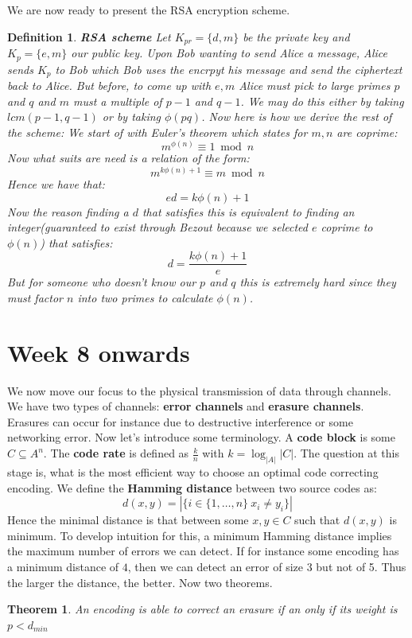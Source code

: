 \documentclass[titlepage]{article}
\newtheorem{theorem}{Theorem}[section]
\newtheorem{definition}{Definition}
\begin{document}
We are now ready to present the RSA encryption scheme.
\begin{definition}\textbf{RSA scheme}
Let $K_{pr} = \{d,m\}$ be the private key and $K_{p} = \{e,m\}$ our public key. Upon Bob wanting to send Alice a message, Alice sends $K_{p}$ to Bob which Bob uses the encrpyt his message and send the ciphertext back to Alice. But before, to come up with $e,m$ Alice must pick to large primes $p$ and $q$ and $m$ must a multiple of $p-1$ and $q-1$. We may do this either by taking $lcm(p-1,q-1)$ or by taking $\phi(pq)$. Now here is how we derive the rest of the scheme:
We start of with Euler's theorem which states for $m,n$ are coprime:
$$m^{\phi(n)} \equiv 1 \bmod{n}$$
Now what suits are need is a relation of the form:
$$m^{k\phi(n) + 1} \equiv m \bmod{n}$$
Hence we have that:
$$ed = k\phi(n)+1$$
Now the reason finding a $d$ that satisfies this is equivalent to finding an integer(guaranteed to exist through Bezout because we selected $e$ coprime to $\phi(n)$) that satisfies:
$$d = \frac{k\phi(n)+1}{e}$$
But for someone who doesn't know our $p$ and $q$ this is extremely hard since they must factor $n$ into two primes to calculate $\phi(n)$. 
\end{definition}


\section{Week 8 onwards}
We now move our focus to the physical transmission of data through channels. We have two types of channels: \textbf{error channels} and \textbf{erasure channels}. Erasures can occur for instance due to destructive interference or some networking error. Now let's introduce some terminology. A \textbf{code block} is some $C \subseteq A^{n}$. The \textbf{code rate} is defined as $\frac{k}{n}$ with $k = \log_{|A|}{|C|}$. The question at this stage is, what is the most efficient way to choose an optimal code correcting encoding. We define the \textbf{Hamming distance} between two source codes as:
$$d(x,y) = |\{i \in \{1,\ldots,n\} \ x_{i} \not = y_{i} \}|$$
Hence the minimal distance is that between some $x,y \in C$ such that $d(x,y)$ is minimum. To develop intuition for this, a minimum Hamming distance implies the maximum number of errors we can detect. If for instance some encoding has a minimum distance of $4$, then we can detect an error of size 3 but not of 5. Thus the larger the distance, the better. Now two theorems.

\begin{theorem}
An encoding is able to correct an erasure if an only if its weight is $p < d_{min}$
\end{theorem}
\end{document}
